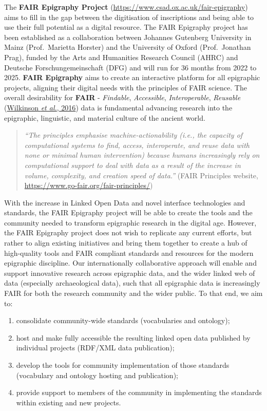 \documentclass[
  12pt,
]{scrreprt}
\providecommand{\tightlist}{%
  \setlength{\itemsep}{0pt}\setlength{\parskip}{0pt}}
\begin{document}
The \textbf{FAIR Epigraphy Project}
(\url{https://www.csad.ox.ac.uk/fair-epigraphy}) aims to fill in the gap
between the digitisation of inscriptions and being able to use their
full potential as a digital resource. The FAIR Epigraphy project has
been established as a collaboration between Johannes Gutenberg
University in Mainz (Prof.~Marietta Horster) and the University of
Oxford (Prof.~Jonathan Prag), funded by the Arts and Humanities Research
Council (AHRC) and Deutsche Forschungemeinschaft (DFG) and will run for
36 months from 2022 to 2025. \textbf{FAIR Epigraphy} aims to create an
interactive platform for all epigraphic projects, aligning their digital
needs with the principles of FAIR science. The overall desirability for
\textbf{FAIR} - \emph{Findable}, \emph{Accessible},
\emph{Interoperable}, \emph{Reusable}
(\protect\hyperlink{ref-wilkinson_fair_2016}{Wilkinson \emph{et al.},
2016}) data is fundamental advancing research into the epigraphic,
linguistic, and material culture of the ancient world.

\begin{quote}
\emph{``The principles emphasise machine-actionability (i.e., the
capacity of computational systems to find, access, interoperate, and
reuse data with none or minimal human intervention) because humans
increasingly rely on computational support to deal with data as a result
of the increase in volume, complexity, and creation speed of data.''}
(FAIR Principles website,
\url{https://www.go-fair.org/fair-principles/})
\end{quote}

With the increase in Linked Open Data and novel interface technologies
and standards, the FAIR Epigraphy project will be able to create the
tools and the community needed to transform epigraphic research in the
digital age. However, the FAIR Epigraphy project does not wish to
replicate any current efforts, but rather to align existing initiatives
and bring them together to create a hub of high-quality tools and FAIR
compliant standards and resources for the modern epigraphic discipline.
Our internationally collaborative approach will enable and support
innovative research across epigraphic data, and the wider linked web of
data (especially archaeological data), such that all epigraphic data is
increasingly FAIR for both the research community and the wider public.
To that end, we aim to:

\begin{enumerate}
\def\labelenumi{\arabic{enumi}.}
\tightlist
\item
  consolidate community-wide standards (vocabularies and ontology);
\item
  host and make fully accessible the resulting linked open data
  published by individual projects (RDF/XML data publication);
\item
  develop the tools for community implementation of those standards
  (vocabulary and ontology hosting and publication);
\item
  provide support to members of the community in implementing the
  standards within existing and new projects.
\end{enumerate}
\end{document}
